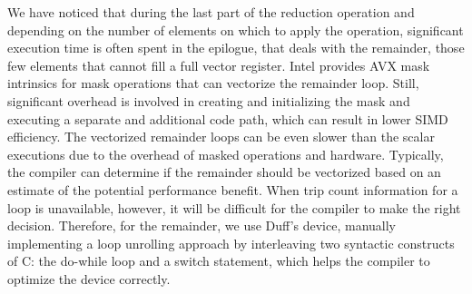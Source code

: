\documentclass[5p,times,twocolumn]{elsarticle}
\begin{document}
We have noticed that during the last part of the reduction operation and depending on the number of elements on which to apply the
operation, significant execution time is often spent in the
epilogue, that deals with the remainder, those few elements that cannot fill a full vector register.
Intel provides AVX mask intrinsics for mask operations that can vectorize the remainder loop.
Still, significant overhead is involved in creating and initializing the mask and
executing a separate and additional code path, which can result in lower SIMD efficiency.
%
The vectorized remainder loops can be even slower than the scalar executions due to the overhead of masked operations and hardware.
%
Typically, the compiler can determine if the remainder should be vectorized
based on an estimate of the potential performance benefit. When trip count information for a
loop is unavailable, however, it will be difficult for the
compiler to make the right decision.
%
Therefore, for the remainder, we use Duff's
device, manually implementing a loop unrolling approach by
interleaving two syntactic constructs of C: the do-while loop and a
switch statement, which helps the compiler to optimize the device
correctly.

\end{document}
